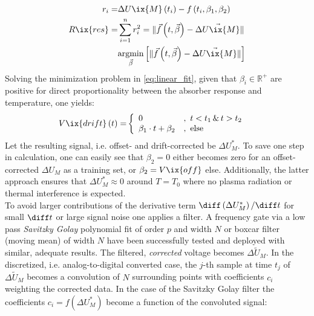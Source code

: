 %
                \begin{align}%
                    \begin{split}\label{eq:linear_fit}%
                        r_{i}=&\Delta U\ix{M}\left(t_{i}\right)-f\left(t_{i},\beta_{1}, \beta_{2}\right)\\%
                        R\ix{res}=&\sum_{i=1}^{n}r_{i}^{2}=\|\vec{f}\left(t, \vec{\beta}\right)-\vec{\Delta U\ix{M}}\|\\%
                        &\underset{\vec{\beta}}{\text{argmin}}\left[\|\vec{f}\left(t, \vec{\beta}\right)-\vec{\Delta U\ix{M}}\|\right]%
                    \end{split}%
                \end{align}%
% 
                Solving the minimization problem in \cref{eq:linear_fit}, given that $\beta_{i}\in\mathbb{R}^{+}$ are positive for direct proportionality between the absorber response and temperature, one yields:%
%
                \begin{align}%
                    V\ix{drift}\left(t\right)=&\left\{%
                    \begin{array}{ll}%
                        0&,\,\,t<t_{1}\,\&\,t>t_{2}\\%
                        \beta_{1}\cdot t+\beta_{2}&,\,\,\text{else}%
                    \end{array}\right.\label{eq:drift}%
                \end{align}%
%
                Let the resulting signal, i.e. offset- and drift-corrected be $\Delta U^{*}_{M}$. To save one step in calculation, one can easily see that $\beta_{2}=0$ either becomes zero for an offset-corrected $\Delta U_{M}$ as a training set, or $\beta_{2}=V\ix{off}$ else. Additionally, the latter approach ensures that $\Delta U^{*}_{M}\approx0$ around $T=T_{0}$ where no plasma radiation or thermal interference is expected.\\%
                To avoid larger contributions of the derivative term $\diff\left(\Delta U^{*}_{M}\right)/\diff t$ for small $\diff t$ or large signal noise one applies a filter. A frequency gate via a low pass \textit{Savitzky Golay} polynomial fit of order $p$ and width $N$ or boxcar filter (moving mean) of width $N$ have been successfully tested and deployed with similar, adequate results. The filtered, \textit{corrected} voltage becomes $\Delta\widetilde{U}_{M}$. In the discretized, i.e. analog-to-digital converted  case, the $j$-th sample at time $t_{j}$ of $\Delta\widetilde{U}_{M}$ becomes a convolution of $N$ surrounding points with coefficients $c_{i}$ weighting the corrected data. In the case of the Savitzky Golay filter the coefficients $c_{i}=f\left(\Delta U_{M}^{*}\right)$ become a function of the convoluted signal:%
